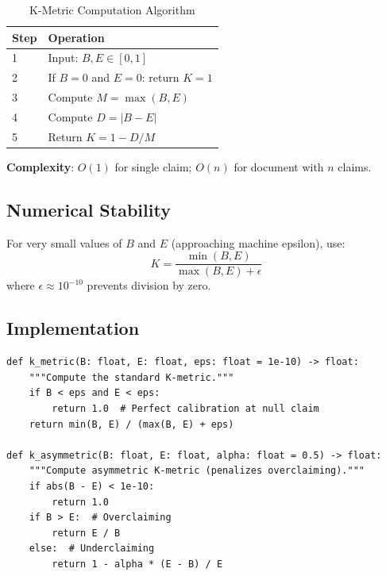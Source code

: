 \documentclass[11pt,a4paper]{article}
\theoremstyle{remark}
\begin{document}
\begin{table}[h]
\centering
\caption{K-Metric Computation Algorithm}
\label{tab:algorithm}
\begin{tabular}{ll}
\toprule
\textbf{Step} & \textbf{Operation} \\
\midrule
1 & Input: $B, E \in [0, 1]$ \\
2 & If $B = 0$ and $E = 0$: return $K = 1$ \\
3 & Compute $M = \max(B, E)$ \\
4 & Compute $D = |B - E|$ \\
5 & Return $K = 1 - D / M$ \\
\bottomrule
\end{tabular}
\end{table}

\textbf{Complexity}: $O(1)$ for single claim; $O(n)$ for document with $n$ claims.

\subsection{Numerical Stability}

For very small values of $B$ and $E$ (approaching machine epsilon), use:
\begin{equation}
K = \frac{\min(B, E)}{\max(B, E) + \epsilon}
\end{equation}
where $\epsilon \approx 10^{-10}$ prevents division by zero.

\subsection{Implementation}

\begin{verbatim}
def k_metric(B: float, E: float, eps: float = 1e-10) -> float:
    """Compute the standard K-metric."""
    if B < eps and E < eps:
        return 1.0  # Perfect calibration at null claim
    return min(B, E) / (max(B, E) + eps)

def k_asymmetric(B: float, E: float, alpha: float = 0.5) -> float:
    """Compute asymmetric K-metric (penalizes overclaiming)."""
    if abs(B - E) < 1e-10:
        return 1.0
    if B > E:  # Overclaiming
        return E / B
    else:  # Underclaiming
        return 1 - alpha * (E - B) / E
\end{verbatim}

\end{document}
